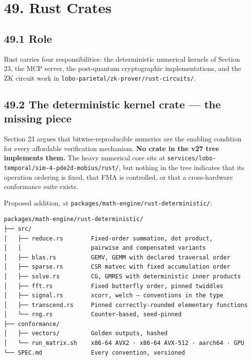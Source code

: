 \documentclass[
  11pt]{report}
\begin{document}
\hypertarget{rust-crates}{%
\chapter{49. Rust Crates}\label{rust-crates}}

\hypertarget{role}{%
\section{49.1 Role}\label{role}}

Rust carries four responsibilities: the deterministic numerical kernels
of Section 23, the MCP server, the post-quantum cryptographic
implementations, and the ZK circuit work in
\texttt{lobo-parietal/zk-prover/rust-circuits/}.

\hypertarget{the-deterministic-kernel-crate-the-missing-piece}{%
\section{49.2 The deterministic kernel crate --- the missing
piece}\label{the-deterministic-kernel-crate-the-missing-piece}}

Section 23 argues that bitwise-reproducible numerics are the enabling
condition for every affordable verification mechanism. \textbf{No crate
in the v27 tree implements them.} The heavy numerical core sits at
\texttt{services/lobo-temporal/sim-4-pde2d-mobius/rust/}, but nothing in
the tree indicates that its operation ordering is fixed, that FMA is
controlled, or that a cross-hardware conformance suite exists.

Proposed addition, at \texttt{packages/math-engine/rust-deterministic/}:

\begin{verbatim}
packages/math-engine/rust-deterministic/
├── src/
│   ├── reduce.rs        Fixed-order summation, dot product,
│   │                    pairwise and compensated variants
│   ├── blas.rs          GEMV, GEMM with declared traversal order
│   ├── sparse.rs        CSR matvec with fixed accumulation order
│   ├── solve.rs         CG, GMRES with deterministic inner products
│   ├── fft.rs           Fixed butterfly order, pinned twiddles
│   ├── signal.rs        xcorr, welch — conventions in the type
│   ├── transcend.rs     Pinned correctly-rounded elementary functions
│   └── rng.rs           Counter-based, seed-pinned
├── conformance/
│   ├── vectors/         Golden outputs, hashed
│   └── run_matrix.sh    x86-64 AVX2 · x86-64 AVX-512 · aarch64 · GPU
└── SPEC.md              Every convention, versioned
\end{verbatim}
\end{document}

